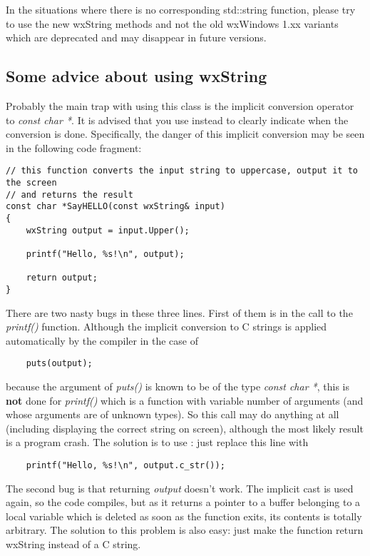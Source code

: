 In the situations where there is no corresponding std::string function, please
try to use the new wxString methods and not the old wxWindows 1.xx variants
which are deprecated and may disappear in future versions.

\subsection{Some advice about using wxString}\label{wxstringadvices}

Probably the main trap with using this class is the implicit conversion operator to 
{\it const char *}. It is advised that you use 
instead to clearly indicate when the conversion is done. Specifically, the
danger of this implicit conversion may be seen in the following code fragment:

\begin{verbatim}
// this function converts the input string to uppercase, output it to the screen
// and returns the result
const char *SayHELLO(const wxString& input)
{
    wxString output = input.Upper();

    printf("Hello, %s!\n", output);

    return output;
}
\end{verbatim}

There are two nasty bugs in these three lines. First of them is in the call to the 
{\it printf()} function. Although the implicit conversion to C strings is applied
automatically by the compiler in the case of

\begin{verbatim}
    puts(output);
\end{verbatim}

because the argument of {\it puts()} is known to be of the type {\it const char *},
this is {\bf not} done for {\it printf()} which is a function with variable
number of arguments (and whose arguments are of unknown types). So this call may
do anything at all (including displaying the correct string on screen), although
the most likely result is a program crash. The solution is to use 
: just replace this line with

\begin{verbatim}
    printf("Hello, %s!\n", output.c_str());
\end{verbatim}

The second bug is that returning {\it output} doesn't work. The implicit cast is
used again, so the code compiles, but as it returns a pointer to a buffer
belonging to a local variable which is deleted as soon as the function exits,
its contents is totally arbitrary. The solution to this problem is also easy:
just make the function return wxString instead of a C string.

